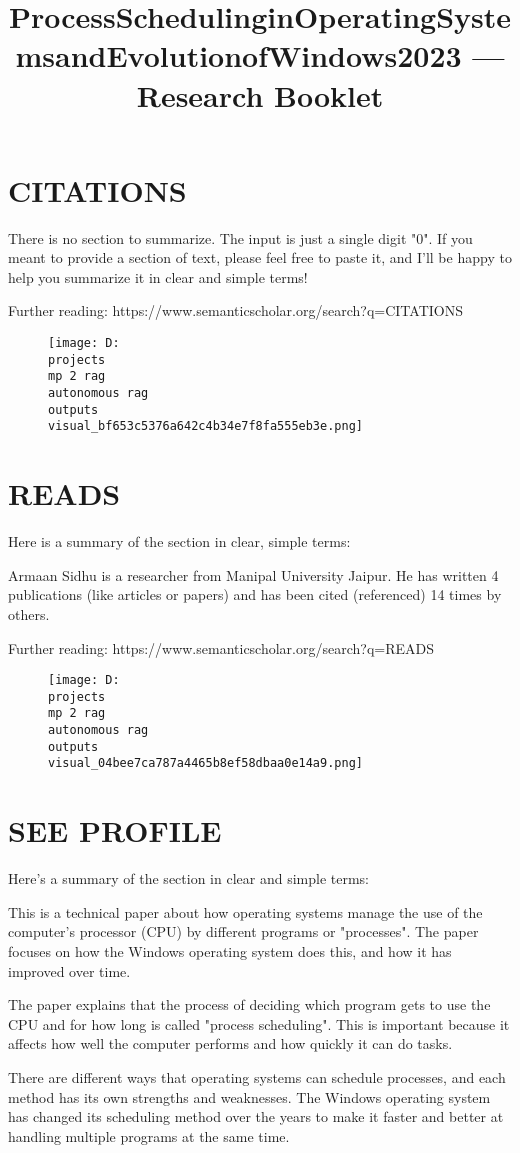 \documentclass[12pt,a4paper]{article}
\title{ProcessSchedulinginOperatingSystemsandEvolutionofWindows2023 — Research Booklet}
\date{}
\begin{document}
\maketitle
\tableofcontents
\newpage
\section{CITATIONS}
There is no section to summarize. The input is just a single digit "0". If you meant to provide a section of text, please feel free to paste it, and I'll be happy to help you summarize it in clear and simple terms!

Further reading: https://www.semanticscholar.org/search?q=CITATIONS
\begin{figure}[h]
\centering
\texttt{[image: D:\\projects\\mp 2 rag\\autonomous rag\\outputs\\visual\_bf653c5376a642c4b34e7f8fa555eb3e.png]}
\end{figure}
\section{READS}
Here is a summary of the section in clear, simple terms:

Armaan Sidhu is a researcher from Manipal University Jaipur. He has written 4 publications (like articles or papers) and has been cited (referenced) 14 times by others.

Further reading: https://www.semanticscholar.org/search?q=READS
\begin{figure}[h]
\centering
\texttt{[image: D:\\projects\\mp 2 rag\\autonomous rag\\outputs\\visual\_04bee7ca787a4465b8ef58dbaa0e14a9.png]}
\end{figure}
\section{SEE PROFILE}
Here's a summary of the section in clear and simple terms:

This is a technical paper about how operating systems manage the use of the computer's processor (CPU) by different programs or "processes". The paper focuses on how the Windows operating system does this, and how it has improved over time.

The paper explains that the process of deciding which program gets to use the CPU and for how long is called "process scheduling". This is important because it affects how well the computer performs and how quickly it can do tasks.

There are different ways that operating systems can schedule processes, and each method has its own strengths and weaknesses. The Windows operating system has changed its scheduling method over the years to make it faster and better at handling multiple programs at the same time.
\end{document}
